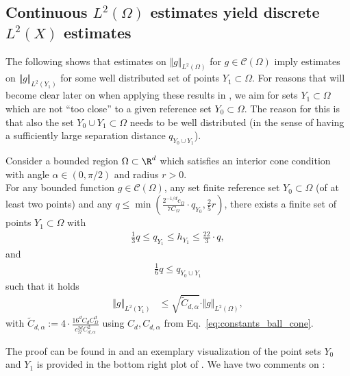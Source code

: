 \documentclass[a4paper, 10pt]{article}
\begin{document}
\subsection{Continuous $L^2(\Omega)$ estimates yield discrete $L^2(X)$ estimates}

%
The following  shows that estimates on $\Vert g \Vert_{L^2(\Omega)}$ for $g \in \mathcal{C}(\Omega)$ imply estimates on $\Vert g \Vert_{L^2(Y_1)}$ for some well distributed set of points $Y_1 \subset \Omega$.
For reasons that will become clear later on when applying these results in , we aim for sets $Y_1 \subset \Omega$ which are not ``too close'' to a given reference set $Y_0 \subset \Omega$.
The reason for this is that also the set $Y_0 \cup Y_1 \subset \Omega$ needs to be well distributed (in the sense of having a sufficiently large separation distance $q_{Y_0 \cup Y_1}$). 



\begin{theorem}
\label{th:utility_theorem_new}
Consider a bounded region $\Omega \subset \R^d$ which satisfies an interior cone condition with angle $\alpha \in (0, \pi/2)$ and radius $r > 0$. \\
For any bounded function $g \in \mathcal{C}(\Omega)$, any set finite reference set $Y_0 \subset \Omega$ (of at least two points) and any $q \leq \min \left( \frac{2^{-1/d} c_\Omega}{7 C_\Omega} \cdot q_{Y_0}, \frac{2}{5}r \right)$, 
there exists a finite set of points $Y_1 \subset \Omega$ with
\begin{align*}
\frac{1}{3} q \leq q_{Y_1} \leq h_{Y_1} \leq \frac{22}{3} \cdot q,
\end{align*}
and
\begin{align*}
\frac{1}{6}q \leq q_{Y_0 \cup Y_1} 
\end{align*}
such that it holds
\begin{align}
\label{eq:utility_theorem_new}
%
%
\Vert g \Vert_{L^2(Y_1)} &\leq \sqrt{\tilde{C}_{d,\alpha}} \cdot \Vert g \Vert_{L^2(\Omega)},
\end{align}
with $\tilde{C}_{d,\alpha} := 4 \cdot  \frac{16^d C_d C_\Omega^d}{c_\Omega^{2d} C_{d, \alpha}^2}$ using $C_d, C_{d, \alpha}$ from Eq.~\eqref{eq:constants_ball_cone}.
\end{theorem}

The proof can be found in  and an exemplary visualization of the point sets $Y_0$ and $Y_1$ is provided in the bottom right plot of .
We have two comments on :
\end{document}

